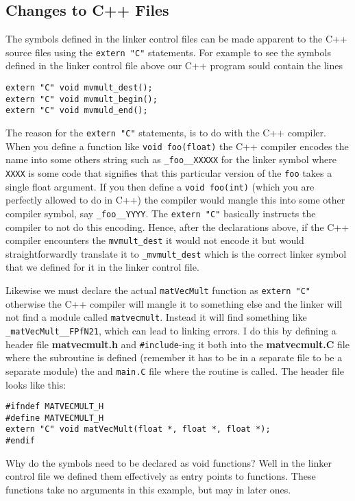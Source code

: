 \subsection{Changes to C++ Files}
The symbols defined in the linker control files can be made apparent to 
the C++ source files using the {\tt extern "C"} statements. For example
to see the symbols defined in the linker control file above our
C++ program sould contain the lines
\begin{verbatim}
extern "C" void mvmult_dest();
extern "C" void mvmult_begin();
extern "C" void mvmuld_end();
\end{verbatim}

The reason for the {\tt extern "C"} statements, is to do with the 
C++ compiler. When you define a function like {\tt void foo(float)}
the C++ compiler encodes the name into some others string such as
{\tt \_foo\_\_XXXXX} for the linker symbol where {\tt XXXX} is some
code that signifies that this particular version of the {\tt foo} 
takes a single float argument. If you then define a {\tt void foo(int)}
(which you are perfectly allowed to do in C++) the compiler would mangle
this into some other compiler symbol, say {\tt \_foo\_\_YYYY}. The {\tt extern "C"} basically instructs the compiler to not do this encoding. Hence, after the
declarations above, if the C++ compiler encounters the {\tt mvmult\_dest}
it would not encode it but would straightforwardly translate it to
{\tt \_mvmult\_dest} which is the correct linker symbol that we defined
for it in the linker control file.

Likewise we must declare the actual {\tt matVecMult} function as {\tt extern "C"} otherwise the C++ compiler will mangle it to something else and the linker
will not find a module called {\tt matvecmult}. Instead it will find something
like {\tt \_matVecMult\_\_FPfN21}, which can lead to linking errors. I do 
this by defining a header file {\bf matvecmult.h} and {\tt \#include}-ing 
it both into the {\bf matvecmult.C} file where the subroutine is defined
(remember it has to be in a separate file to be a separate module) 
the and {\tt main.C} file where the routine is called. The header file
looks like this:
\begin{verbatim}
#ifndef MATVECMULT_H
#define MATVECMULT_H
extern "C" void matVecMult(float *, float *, float *);
#endif
\end{verbatim}
	
Why do the symbols need to be declared as void functions? Well in the 
linker control file we defined them effectively as entry points to functions.
These functions take no arguments in this example, but may in later ones.

